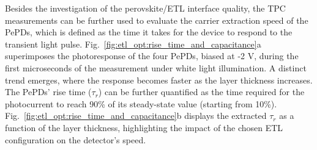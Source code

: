 Besides the investigation of the perovskite/ETL interface quality, the TPC measurements can be further used to evaluate the carrier extraction speed of the PePDs, which is defined as the time it takes for the device to respond to the transient light pulse. Fig.~\ref{fig:etl_opt:rise_time_and_capacitance}a superimposes the photoresponse of the four PePDs, biased at -2 V, during the first microseconds of the measurement under white light illumination. A distinct trend emerges, where the response becomes faster as the  layer thickness increases. The PePDs' rise time ($\tau_r$) can be further quantified as the time required for the photocurrent to reach 90\% of its steady-state value (starting from 10\%). Fig.~\ref{fig:etl_opt:rise_time_and_capacitance}b displays the extracted $\tau_r$ as a function of the  layer thickness, highlighting the impact of the chosen ETL configuration on the detector's speed.  

